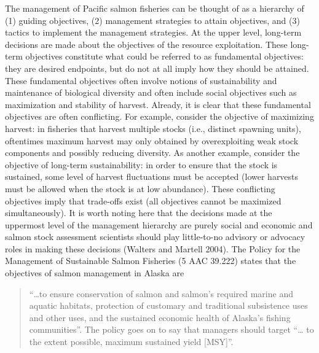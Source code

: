\documentclass[12pt,]{book}
\theoremstyle{definition}
\theoremstyle{definition}
\theoremstyle{definition}
\theoremstyle{remark}
\begin{document}
The management of Pacific salmon fisheries can be thought of as a
hierarchy of (1) guiding objectives, (2) management strategies to attain
objectives, and (3) tactics to implement the management strategies. At
the upper level, long-term decisions are made about the objectives of
the resource exploitation. These long-term objectives constitute what
could be referred to as fundamental objectives: they are desired
endpoints, but do not at all imply how they should be attained. These
fundamental objectives often involve notions of sustainability and
maintenance of biological diversity and often include social objectives
such as maximization and stability of harvest. Already, it is clear that
these fundamental objectives are often conflicting. For example,
consider the objective of maximizing harvest: in fisheries that harvest
multiple stocks (i.e., distinct spawning units), oftentimes maximum
harvest may only obtained by overexploiting weak stock components and
possibly reducing diversity. As another example, consider the objective
of long-term sustainability: in order to ensure that the stock is
sustained, some level of harvest fluctuations must be accepted (lower
harvests must be allowed when the stock is at low abundance). These
conflicting objectives imply that trade-offs exist (all objectives
cannot be maximized simultaneously). It is worth noting here that the
decisions made at the uppermost level of the management hierarchy are
purely social and economic and salmon stock assessment scientists should
play little-to-no advisory or advocacy roles in making these decisions
(Walters and Martell 2004). The Policy for the Management of Sustainable
Salmon Fisheries (5 AAC 39.222) states that the objectives of salmon
management in Alaska are

\begin{quote}
``\ldots{}to ensure conservation of salmon and salmon's required marine
and aquatic habitats, protection of customary and traditional
subsistence uses and other uses, and the sustained economic health of
Alaska's fishing communities''. The policy goes on to say that managers
should target ``\ldots{} to the extent possible, maximum sustained yield
{[}MSY{]}''.
\end{quote}
\end{document}
